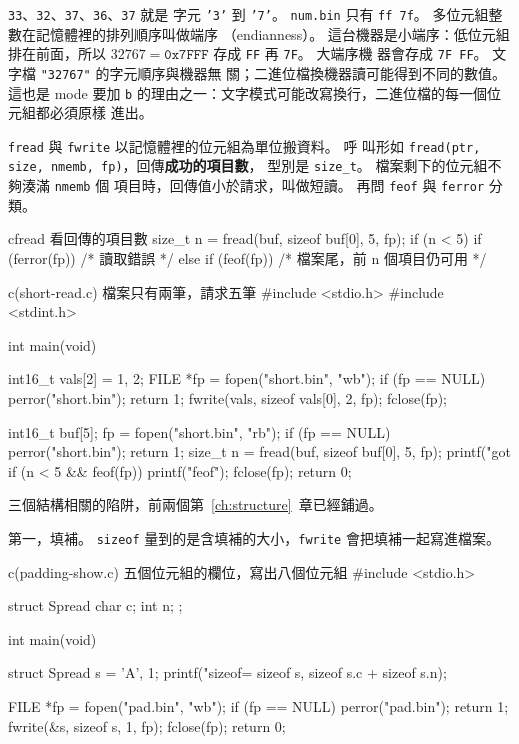 \texttt{33}、\texttt{32}、\texttt{37}、\texttt{36}、\texttt{37} 就是
字元 \texttt{'3'} 到 \texttt{'7'}。 \texttt{num.bin} 只有
\texttt{ff 7f}。 多位元組整數在記憶體裡的排列順序叫做端序
（endianness）。 這台機器是小端序：低位元組排在前面，所以
$32767 = \mathtt{0x7FFF}$ 存成 \texttt{FF} 再 \texttt{7F}。 大端序機
器會存成 \texttt{7F FF}。 文字檔 \texttt{"32767"} 的字元順序與機器無
關；二進位檔換機器讀可能得到不同的數值。 這也是 mode 要加 \texttt{b}
的理由之一：文字模式可能改寫換行，二進位檔的每一個位元組都必須原樣
進出。

\texttt{fread} 與 \texttt{fwrite} 以記憶體裡的位元組為單位搬資料。 呼
叫形如 \texttt{fread(ptr, size, nmemb, fp)}，回傳\textbf{成功的項目數}，
型別是 \texttt{size\_t}。 檔案剩下的位元組不夠湊滿 \texttt{nmemb} 個
項目時，回傳值小於請求，叫做短讀。 再問 \texttt{feof} 與
\texttt{ferror} 分類。

\begin{code}{c}{fread 看回傳的項目數}
size_t n = fread(buf, sizeof buf[0], 5, fp);
if (n < 5) {
    if (ferror(fp)) {
        /* 讀取錯誤 */
    } else if (feof(fp)) {
        /* 檔案尾，前 n 個項目仍可用 */
    }
}
\end{code}

\begin{example}{c}{(short-read.c) 檔案只有兩筆，請求五筆}
#include <stdio.h>
#include <stdint.h>

int main(void) {
    int16_t vals[2] = {1, 2};
    FILE *fp = fopen("short.bin", "wb");
    if (fp == NULL) {
        perror("short.bin");
        return 1;
    }
    fwrite(vals, sizeof vals[0], 2, fp);
    fclose(fp);

    int16_t buf[5];
    fp = fopen("short.bin", "rb");
    if (fp == NULL) {
        perror("short.bin");
        return 1;
    }
    size_t n = fread(buf, sizeof buf[0], 5, fp);
    printf("got %
    if (n < 5 && feof(fp)) {
        printf("feof\n");
    }
    fclose(fp);
    return 0;
}
\end{example}


三個結構相關的陷阱，前兩個第~\ref{ch:structure}~章已經鋪過。

第一，填補。 \texttt{sizeof} 量到的是含填補的大小，\texttt{fwrite}
會把填補一起寫進檔案。

\begin{example}{c}{(padding-show.c) 五個位元組的欄位，寫出八個位元組}
#include <stdio.h>

struct Spread {
    char c;
    int n;
};

int main(void) {
    struct Spread s = {'A', 1};
    printf("sizeof=%
           sizeof s, sizeof s.c + sizeof s.n);

    FILE *fp = fopen("pad.bin", "wb");
    if (fp == NULL) {
        perror("pad.bin");
        return 1;
    }
    fwrite(&s, sizeof s, 1, fp);
    fclose(fp);
    return 0;
}
\end{example}

